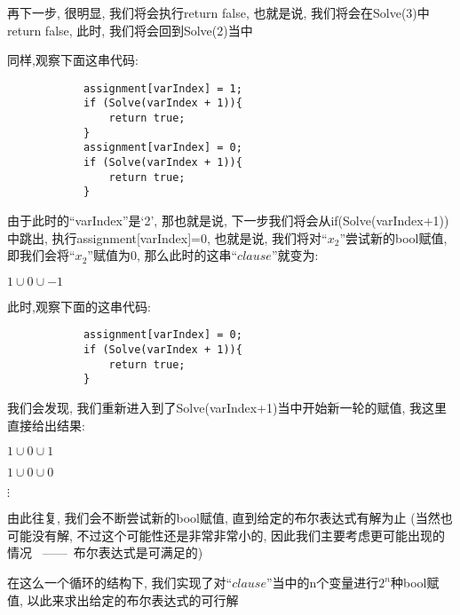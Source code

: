         \par
        再下一步,
        很明显,
        我们将会执行return false,
        也就是说,
        我们将会在Solve(3)中return false,
        此时,
        我们将会回到Solve(2)当中
        \par
        同样,观察下面这串代码:
        \begin{lstlisting}
            assignment[varIndex] = 1;
            if (Solve(varIndex + 1)){
                return true;
            }
            assignment[varIndex] = 0;
            if (Solve(varIndex + 1)){
                return true;
            }
        \end{lstlisting}
        \par
        由于此时的``varIndex''是`2',
        那也就是说,
        下一步我们将会从if(Solve(varIndex+1))中跳出,
        执行assignment[varIndex]=0,
        也就是说,
        我们将对``$x_{2}$''尝试新的bool赋值,
        即我们会将``$x_{2}$''赋值为0,
        那么此时的这串``$clause$''就变为:
        \begin{center}
            $1 \cup 0 \cup -1$
        \end{center}
        \par
        此时,观察下面的这串代码:
        \begin{lstlisting}
            assignment[varIndex] = 0;
            if (Solve(varIndex + 1)){
                return true;
            }
        \end{lstlisting}
        \par
        我们会发现,
        我们重新进入到了Solve(varIndex+1)当中开始新一轮的赋值,
        我这里直接给出结果:
        \begin{center}
            $1 \cup 0 \cup 1$
        \end{center}
        \begin{center}
            $1 \cup 0 \cup 0$
        \end{center}
        \begin{center}
            $\vdots$
        \end{center}
        \par
        由此往复,
        我们会不断尝试新的bool赋值,
        直到给定的布尔表达式有解为止
        (当然也可能没有解,
        不过这个可能性还是非常非常小的,
        因此我们主要考虑更可能出现的情况
        \ ——\ 
        布尔表达式是可满足的)
        \par
        在这么一个循环的结构下,
        我们实现了对``$clause$''当中的n个变量进行$2^{n}$种bool赋值,
        以此来求出给定的布尔表达式的可行解
